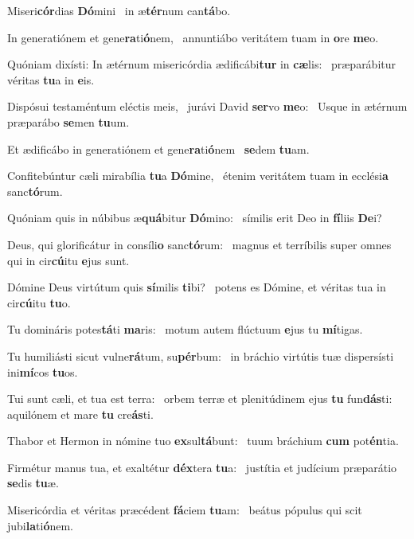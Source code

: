 \item Miseri\textbf{cór}dias \textbf{Dó}mini~\psstar{} in æ\textbf{tér}num can\textbf{tá}bo.
\item In generatiónem et gene\textbf{ra}ti\textbf{ó}\-nem,~\psstar{} annuntiábo veritátem tuam in \textbf{o}re \textbf{me}o.
\item Quóniam dixísti: In ætérnum misericórdia ædificábi\textbf{tur} in \textbf{cæ}lis:~\psstar{} præparábitur véritas \textbf{tu}a in \textbf{e}is.
\item Dispósui testaméntum eléctis meis,~\pscross{} jurávi David \textbf{ser}vo \textbf{me}o:~\psstar{} Usque in ætérnum præparábo \textbf{se}men \textbf{tu}um.
\item Et ædificábo in generatiónem et gene\textbf{ra}ti\textbf{ó}nem~\psstar{} \textbf{se}dem \textbf{tu}am.
\item Confitebúntur cæli mirabília \textbf{tu}a \textbf{Dó}mine,~\psstar{} étenim veritátem tuam in ecclési\textbf{a} sanc\textbf{tó}rum.
\item Quóniam quis in núbibus æ\textbf{quá}bitur \textbf{Dó}mino:~\psstar{} símilis erit Deo in \textbf{fí}liis \textbf{De}i?
\item Deus, qui glorificátur in consíli\textbf{o} sanc\textbf{tó}rum:~\psstar{} magnus et terríbilis super omnes qui in cir\textbf{cú}itu \textbf{e}jus sunt.
\item Dómine Deus virtútum quis \textbf{sí}milis \textbf{ti}bi?~\psstar{} potens es Dómine, et véritas tua in cir\textbf{cú}itu \textbf{tu}o.
\item Tu domináris potes\textbf{tá}ti \textbf{ma}ris:~\psstar{} motum autem flúctuum \textbf{e}jus tu \textbf{mí}tigas.
\item Tu humiliásti sicut vulne\textbf{rá}\-tum, su\textbf{pér}bum:~\psstar{} in bráchio virtútis tuæ dispersísti ini\textbf{mí}cos \textbf{tu}os.
\item Tui sunt cæli, et tua est terra:~\pscross{} orbem terræ et plenitúdinem ejus \textbf{tu} fun\textbf{dás}ti:~\psstar{} aquilónem et mare \textbf{tu} cre\textbf{ás}ti.
\item Thabor et Hermon in nómine tuo \textbf{ex}sul\textbf{tá}bunt:~\psstar{} tuum bráchium \textbf{cum} pot\textbf{én}tia.
\item Firmétur manus tua, et exaltétur \textbf{déx}tera \textbf{tu}a:~\psstar{} justítia et judícium præparátio \textbf{se}dis \textbf{tu}æ.
\item Misericórdia et véritas præcédent \textbf{fá}ciem \textbf{tu}am:~\psstar{} beátus pópulus qui scit jubi\textbf{la}ti\textbf{ó}nem.
